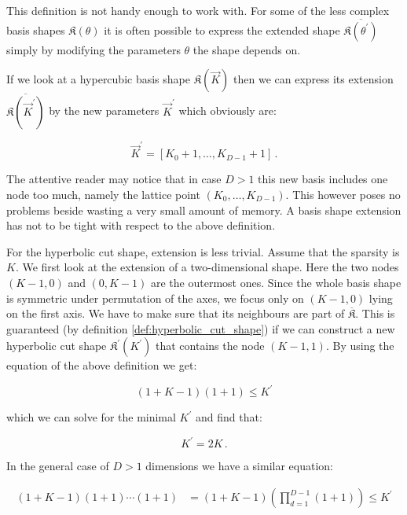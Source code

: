 This definition is not handy enough to work with. For some of the less complex basis
shapes $\mathfrak{K}(\theta)$ it is often possible to express the extended shape
$\overline{\mathfrak{K}(\theta^\prime)}$ simply by modifying the parameters
$\theta$ the shape depends on.

If we look at a hypercubic basis shape $\mathfrak{K}(\vec{K})$ then we can express
its extension $\overline{\mathfrak{K}(\vec{K}^\prime)}$ by the new parameters
$\vec{K}^\prime$ which obviously are:

\begin{equation} \label{eq:extend_hypercubic}
  \vec{K}^\prime = [ K_0 + 1, \ldots, K_{D-1} +1 ] \,.
\end{equation}

The attentive reader may notice that in case $D > 1$ this new basis
includes one node too much, namely the lattice point $(K_0, \ldots, K_{D-1})$.
This however poses no problems beside wasting a very small amount of memory.
A basis shape extension has not to be tight with respect to the above definition.

For the hyperbolic cut shape, extension is less trivial. Assume that the sparsity is $K$.
We first look at the extension of a two-dimensional shape. Here the two nodes
$(K-1, 0)$ and $(0, K-1)$ are the outermost ones. Since the whole basis shape is
symmetric under permutation of the axes, we focus only on $(K-1, 0)$ lying on the first
axis. We have to make sure that its neighbours are part of $\overline{\mathfrak{K}}$.
This is guaranteed (by definition \ref{def:hyperbolic_cut_shape}) if we can
construct a new hyperbolic cut shape $\mathfrak{K}^\prime(K^\prime)$ that
contains the node $(K-1,1)$. By using the equation of the above definition we get:

\begin{equation*}
  (1+K-1)(1+1) \leq K^\prime
\end{equation*}

which we can solve for the minimal $K^\prime$ and find that:

\begin{equation} \label{eq:extend_hyperbolic_cut_1D}
  K^\prime = 2 K \,.
\end{equation}

In the general case of $D>1$ dimensions we have a similar equation:

\begin{align*}
  (1+K-1)(1+1)\cdots(1+1) & = (1+K-1)\left(\prod_{d=1}^{D-1}(1+1)\right) \leq K^\prime
\end{align*}

